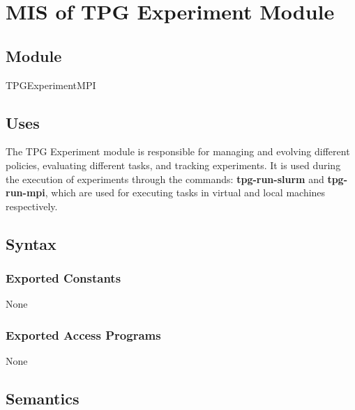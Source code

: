 \documentclass[12pt, titlepage]{article}
\begin{document}
\section{MIS of TPG Experiment Module} \label{TPGExperimentModule}

\subsection{Module}
TPGExperimentMPI

\subsection{Uses}
The TPG Experiment module is responsible for managing and evolving different policies, evaluating different tasks, and tracking experiments. It is used during the execution of experiments through the commands: \textbf{tpg-run-slurm} and \textbf{tpg-run-mpi}, which are used for executing tasks in virtual and local machines respectively.
\subsection{Syntax}

\subsubsection{Exported Constants}
None

\subsubsection{Exported Access Programs}
None

\subsection{Semantics}
\end{document}
